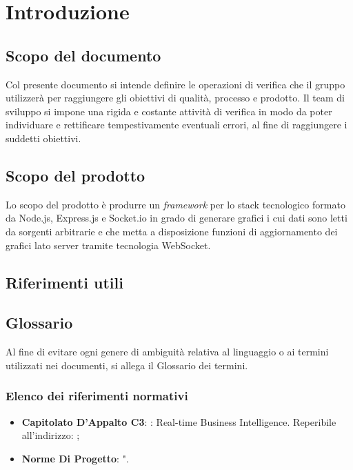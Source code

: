 
\section{Introduzione}
	\subsection{Scopo del documento}
		Col presente documento si intende definire le operazioni di verifica che il gruppo \groupname{} utilizzerà per raggiungere gli obiettivi di qualità, processo e prodotto. Il team di sviluppo si impone una rigida e costante attività di verifica in modo da poter individuare e rettificare tempestivamente eventuali errori, al fine di raggiungere i suddetti obiettivi. 
	\subsection{Scopo del prodotto}
		Lo scopo del prodotto è produrre un \textit{framework} per lo stack tecnologico formato da Node.js, Express.js e Socket.io in grado di generare grafici i cui dati sono letti da sorgenti arbitrarie e che metta a disposizione funzioni di aggiornamento dei grafici lato server tramite tecnologia WebSocket.
	\subsection{Riferimenti utili}
		\subsection{Glossario}
			Al fine di evitare ogni genere di ambiguità relativa al linguaggio o ai termini utilizzati nei documenti, si allega il Glossario dei termini.
		\subsubsection{Elenco dei riferimenti normativi}
			\begin{itemize}
				\item \textbf{Capitolato D'Appalto C3}: \projectname{}: Real-time Business Intelligence. Reperibile all'indirizzo: ;
				\item \textbf{Norme Di Progetto}: ".
			\end{itemize}
